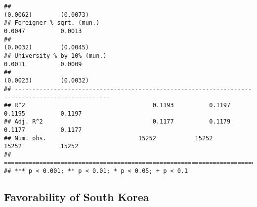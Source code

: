 \documentclass[
]{article}
\begin{document}
\begin{verbatim}
##                                                                       (0.0062)        (0.0073)   
## Foreigner % sqrt. (mun.)                                               0.0047          0.0013    
##                                                                       (0.0032)        (0.0045)   
## University % by 10% (mun.)                                             0.0011          0.0009    
##                                                                       (0.0023)        (0.0032)   
## -------------------------------------------------------------------------------------------------
## R^2                                    0.1193          0.1197          0.1195          0.1197    
## Adj. R^2                               0.1177          0.1179          0.1177          0.1177    
## Num. obs.                          15252           15252           15252           15252         
## =================================================================================================
## *** p < 0.001; ** p < 0.01; * p < 0.05; + p < 0.1
\end{verbatim}

\hypertarget{favorability-of-south-korea-1}{%
\subsection{Favorability of South
Korea}\label{favorability-of-south-korea-1}}
\end{document}

